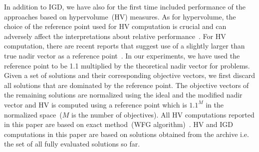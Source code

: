 {\color{blue} In addition to IGD, we have also for the first time included performance of the approaches based on hypervolume~(HV) measures. As for hypervolume, the choice of the reference point used for HV computation is crucial and can adversely affect the interpretations about relative performance~\cite{KHTYuan2016many,KHTishibuchi2010many}. For HV computation, there are recent reports that suggest use of a slightly larger than true nadir vector as a reference point~\cite{KHTYuan2016many,KHTishibuchi2010many}. In our experiments, we have used the reference point to be 1.1 multiplied by the theoretical nadir vector for problems. Given a set of solutions and their corresponding objective vectors, we first discard all solutions that are dominated by the reference point. The objective vectors of the remaining solutions are normalized using the ideal and the modified nadir vector and HV is computed using a reference point which is $1.1^M$ in the normalized space~($M$ is the number of objectives). All HV computations reported in this paper are based on exact method~(WFG algorithm)~\cite{KHTwhile2012hv}. HV and IGD computations in this paper are based on solutions obtained from the archive i.e. the set of all fully evaluated solutions so far. }

